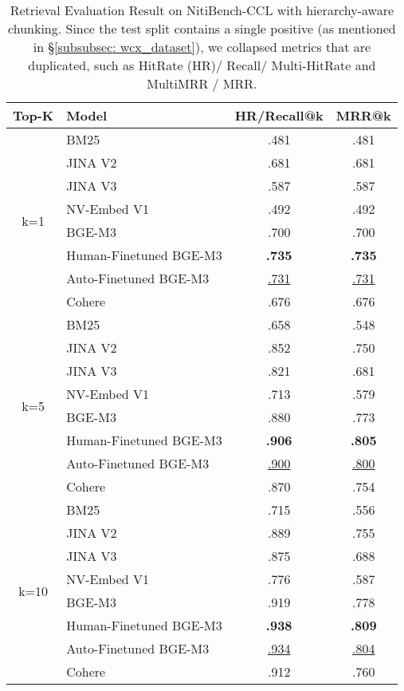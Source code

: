 \begin{table}[!ht]
\centering

\small
\begin{tabular}{@{}clcc@{}}
\toprule
\textbf{Top-K} & \textbf{Model} & \textbf{HR/Recall@k} & \textbf{MRR@k} \\ \midrule
\multirow{8}{*}{k=1} 
  & BM25                   & .481 & .481 \\
  & JINA V2                & .681 & .681 \\
  & JINA V3                & .587 & .587 \\
  & NV-Embed V1            & .492 & .492 \\
  & BGE-M3                 & .700 & .700 \\
  & Human-Finetuned BGE-M3 & \textbf{.735} & \textbf{.735} \\
  & Auto-Finetuned BGE-M3  & \underline{.731} & \underline{.731} \\
  & Cohere                 & .676 & .676 \\ \midrule
\multirow{8}{*}{k=5} 
  & BM25                   & .658 & .548 \\
  & JINA V2                & .852 & .750 \\
  & JINA V3                & .821 & .681 \\
  & NV-Embed V1            & .713 & .579 \\
  & BGE-M3                 & .880 & .773 \\
  & Human-Finetuned BGE-M3 & \textbf{.906} & \textbf{.805} \\
  & Auto-Finetuned BGE-M3  & \underline{.900} & \underline{.800} \\
  & Cohere                 & .870 & .754 \\ \midrule
\multirow{8}{*}{k=10} 
  & BM25                   & .715 & .556 \\
  & JINA V2                & .889 & .755 \\
  & JINA V3                & .875 & .688 \\
  & NV-Embed V1            & .776 & .587 \\
  & BGE-M3                 & .919 & .778 \\
  & Human-Finetuned BGE-M3 & \textbf{.938} & \textbf{.809} \\
  & Auto-Finetuned BGE-M3  & \underline{.934} & \underline{.804} \\
  & Cohere                 & .912 & .760 \\ \bottomrule
\end{tabular}
\caption{Retrieval Evaluation Result on NitiBench-CCL with hierarchy-aware chunking. Since the test split contains a single positive (as mentioned in \S \ref{subsubsec: wcx_dataset}), we collapsed metrics that are duplicated, such as HitRate (HR)/ Recall/ Multi-HitRate and MultiMRR / MRR.}
\label{table: retrieval_wangchan}
\end{table}


